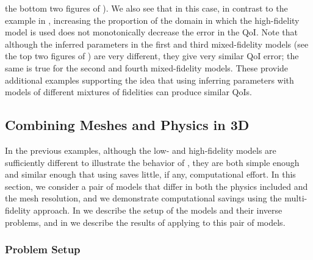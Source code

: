 the bottom two figures of ). We also see that in this case, in contrast to the example in , increasing the proportion of the domain in which the high-fidelity model is used does not monotonically decrease the error in the QoI. Note that although the inferred parameters in the first and third mixed-fidelity models (see 
the top two figures of ) are very different, they give very similar QoI error; the same is true for the second and fourth mixed-fidelity models. These provide additional examples supporting the idea that using inferring parameters with models of different mixtures of fidelities can produce similar QoIs.


\subsection{Combining Meshes and Physics in 3D} \label{sec:diffvcdr3D}

In the previous examples, although the low- and high-fidelity models are sufficiently different to illustrate the behavior of , they are both simple enough and similar enough that using  saves little, if any, computational effort. In this section, we consider a pair of models that differ in both the physics included and the mesh resolution, and we demonstrate computational savings using the multi-fidelity approach. In  we describe the setup of the models and their inverse problems, and in  we describe the results of applying  to this pair of models.

\subsubsection{Problem Setup} \label{sec:setup3D_diffmesh}

